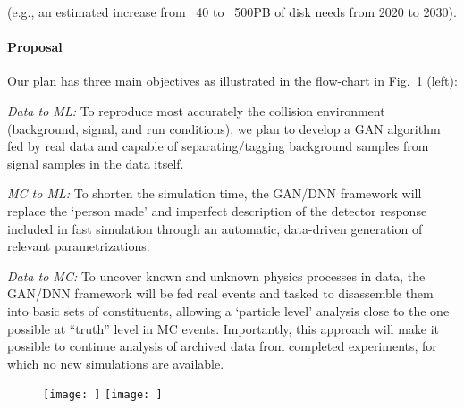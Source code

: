 (e.g., an estimated increase from ~40 to ~500PB of disk needs from 2020 to 2030).

\vspace{-0.5cm}
\paragraph{Proposal} Our plan has three main objectives as illustrated in the flow-chart in Fig.~\ref{fig:concept} (left):

\textit{Data to ML:} To reproduce most accurately the collision environment (background, signal, and run conditions), we plan to develop a GAN algorithm fed by real data and capable of separating/tagging background samples from signal samples in the data itself.

\textit{MC to ML:} To shorten the simulation time, the GAN/DNN framework will replace the `person made' and imperfect description of the detector response included in fast simulation through an automatic, data-driven generation of relevant parametrizations.

\textit{Data to MC:} To uncover known and unknown physics processes in data, the GAN/DNN framework will be fed real events and tasked to disassemble them into basic sets of constituents, allowing a `particle level' analysis close to the one possible at ``truth'' level in MC events. Importantly, this approach will make it possible to continue analysis of archived data  from completed experiments, for which no new simulations are available.


\begin{figure}[!ht]
\vspace{-0.4cm}
\begin{center}
\texttt{[image: ]}
\hspace{0.03\textwidth}
\texttt{[image: ]}
\vspace{-0.5cm}
\caption{}
\label{fig:concept}
\end{center}
\end{figure}
\vspace{-0.8cm}




